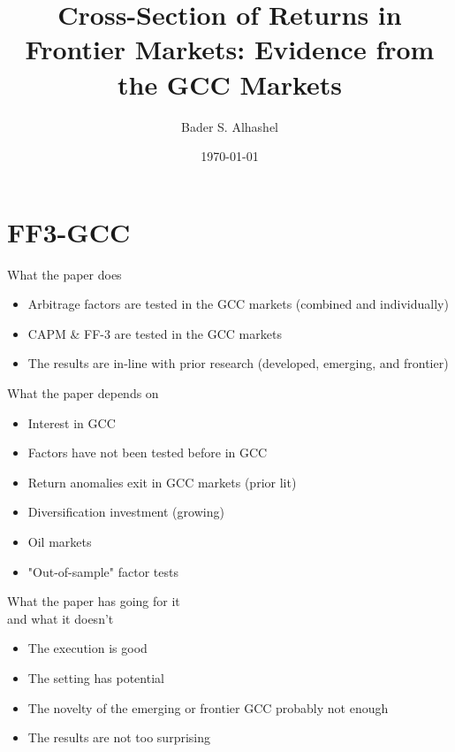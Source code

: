 \documentclass[xcolor=table]{beamer}
\begin{document}
\title[GCC Markets]{\textbf{Cross-Section of Returns in Frontier Markets:
		Evidence from the GCC Markets}}
\vspace{-24pt}
\author[J. Poland]{{Bader S. Alhashel}}
\date{\today}

\begin{frame}
\titlepage
\end{frame}

\section{FF3-GCC}
\begin{frame}{What the paper does}
   \begin{itemize}[<+->]
   	\item Arbitrage factors are tested in the GCC markets (combined and individually)
   	\item CAPM \& FF-3 are tested in the GCC markets
   	\item The results are in-line with prior research (developed, emerging, and frontier)
   \end{itemize}
\end{frame}

\begin{frame}{What the paper depends on}
 \begin{itemize}[<+->]
 	\item Interest in GCC
 	\item Factors have not been tested before in GCC
 	\item Return anomalies exit in GCC markets (prior lit)
 	\item Diversification investment (growing)
 	\item Oil markets
 	\item "Out-of-sample" factor tests
 \end{itemize}
\end{frame}

\begin{frame}{What the paper has going for it\\
		and what it doesn't}
\begin{itemize}[<+->]
	\item The execution is good
	\item The setting has potential
	\item The novelty of the emerging or frontier GCC probably not enough
	\item The results are not too surprising
\end{itemize}
\end{frame}
\end{document}
